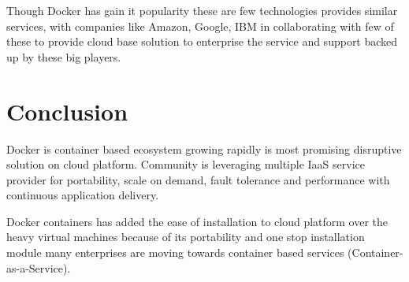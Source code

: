\documentclass{acm_proc_article-sp}
\begin{document}
Though Docker has gain it popularity these are few technologies provides similar services, with companies like Amazon, Google, IBM in collaborating with few of these to provide cloud base solution to enterprise the service and support backed up by these big players.

\section{Conclusion}
Docker is container based ecosystem growing rapidly is most promising disruptive solution on cloud platform. Community is leveraging multiple IaaS service provider for portability, scale on demand, fault tolerance and performance with continuous application delivery.

Docker containers has added the ease of installation to cloud platform over the heavy virtual machines because of its portability and one stop installation module many enterprises are moving towards container based services (Container-as-a-Service).




\end{document}
